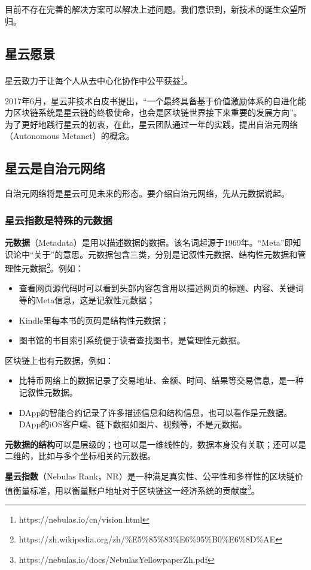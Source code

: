 目前不存在完善的解决方案可以解决上述问题。我们意识到，新技术的诞生众望所归。

\subsection{星云愿景}
星云致力于让每个人从去中心化协作中公平获益\footnote{https://nebulas.io/cn/vision.html}。

2017年6月，星云非技术白皮书提出，“⼀个最终具备基于价值激励体系的⾃进化能力区块链系统是星云链的终极使命，也会是区块链世界接下来重要的发展方向”。为了更好地践行星云的初衷，在此，星云团队通过一年的实践，提出自治元网络（Autonomous Metanet）的概念。

\subsection{星云是自治元网络}
自治元网络将是星云可见未来的形态。要介绍自治元网络，先从元数据说起。
\subsubsection{星云指数是特殊的元数据}
\textbf{元数据}（Metadata）是用以描述数据的数据。该名词起源于1969年。“Meta”即知识论中“关于”的意思。元数据包含三类，分别是记叙性元数据、结构性元数据和管理性元数据\footnote{https://zh.wikipedia.org/zh/\%E5\%85\%83\%E6\%95\%B0\%E6\%8D\%AE}。例如：
\begin{itemize}
\item 查看网页源代码时可以看到头部内容包含用以描述网页的标题、内容、关键词等的Meta信息，这是记叙性元数据；
\item Kindle里每本书的页码是结构性元数据；
\item 图书馆的书目索引系统便于读者查找图书，是管理性元数据。
\end{itemize}
区块链上也有元数据，例如：
\begin{itemize}
\item 比特币网络上的数据记录了交易地址、金额、时间、结果等交易信息，是一种记叙性元数据。
\item DApp的智能合约记录了许多描述信息和结构信息，也可以看作是元数据。DApp的iOS客户端、链下数据如图片、视频等，不是元数据。
\end{itemize}

\textbf{元数据的结构}可以是层级的；也可以是一维线性的，数据本身没有关联；还可以是二维的，比如与多个坐标相关的元数据。



\textbf{星云指数}（Nebulas Rank，NR）是一种满足真实性、公平性和多样性的区块链价值衡量标准，用以衡量账户地址对于区块链这一经济系统的贡献度\footnote{https://nebulas.io/docs/NebulasYellowpaperZh.pdf}。

